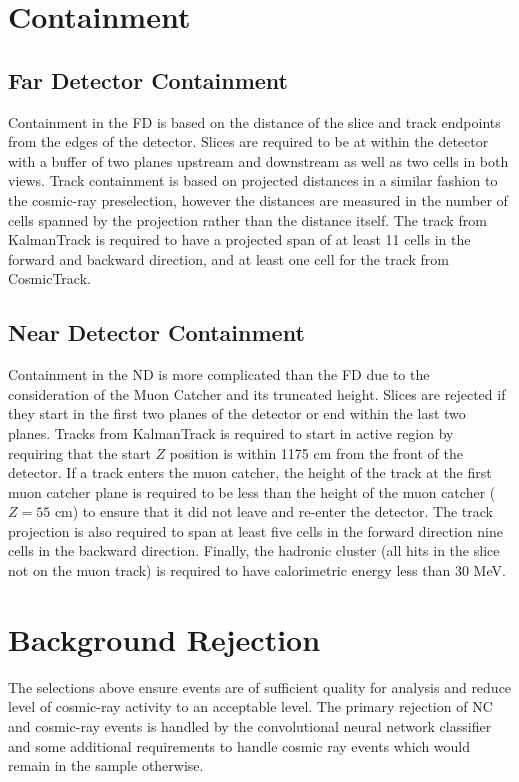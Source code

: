 \section{Containment}

\subsection{Far Detector Containment}

Containment in the FD is based on the distance of the slice and track
endpoints from the edges of the detector.
Slices are required to be at within the detector with a buffer of two
planes upstream and downstream as well as two cells in both views.
Track containment is based on projected distances in a similar fashion
to the cosmic-ray preselection, however the distances are measured in
the number of cells spanned by the projection rather than the distance itself.
The track from KalmanTrack is required to have a projected span of at least
11 cells in the forward and backward direction, and at least one cell
for the track from CosmicTrack.

\subsection{Near Detector Containment}

Containment in the ND is more complicated than the FD due to the consideration
of the Muon Catcher and its truncated height.
Slices are rejected if they start in the first two planes of the detector or
end within the last two planes.
Tracks from KalmanTrack is required to start in active region by requiring that
the start $Z$ position is within 1175 cm from the front of the detector.
If a track enters the muon catcher, the height of the track
at the first muon catcher plane is required to be less than the height of
the muon catcher ($Z = 55$ cm) to ensure that it did not leave and re-enter
the detector.
The track projection is also required to span at least five cells in the 
forward direction nine cells in the backward direction.
Finally, the hadronic cluster (all hits in the slice not on the muon track)
is required to have calorimetric energy less than 30 MeV.


\section{Background Rejection}

The selections above ensure events are of sufficient quality for analysis
and reduce level of cosmic-ray activity to an acceptable level.
The primary rejection of NC and cosmic-ray events is handled by
the convolutional neural network classifier and some additional requirements
to handle cosmic ray events which would remain in the sample otherwise.

